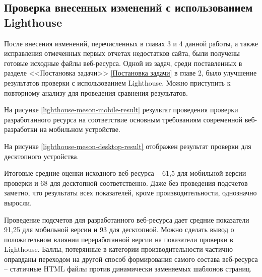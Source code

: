 
\subsection{Проверка внесенных изменений с использованием Lighthouse}

После внесения изменений, перечисленных в главах 3 и 4 данной работы, а также исправления отмеченных первых отчетах недостатков сайта, были получены готовые исходные файлы веб-ресурса.
Одной из задач, среди поставленных в разделе <<Постановка задачи>> \ref{Постановка задачи} в главе 2, было улучшение результатов проверки с использованием Lighthouse.
Можно приступить к повторному анализу для проведения сравнения результатов.

На рисунке \ref{lighthouse-meson-mobile-result} результат проведения проверки разработанного ресурса на соответствие основным требованиям современной веб-разработки на мобильном устройстве.



На рисунке \ref{lighthouse-meson-desktop-result} отображен результат проверки для десктопного устройства.


Итоговые средние оценки исходного веб-ресурса -- 61,5 для мобильной версии проверки и 68 для десктопной соответственно.
Даже без проведения подсчетов заметно, что результаты всех показателей, кроме производительности, однозначно выросли.

Проведение подсчетов для разработанного веб-ресурса дает средние показатели 91,25 для мобильной версии и 93 для десктопной.
Можно сделать вывод о положительном влиянии переработанной версии на показатели проверки в Lighthouse.
Баллы, потерянные в категории производительности частично оправданы переходом на другой способ формирования самого состава веб-ресурса -- статичные HTML файлы против динамически заменяемых шаблонов страниц.

\clearpage
